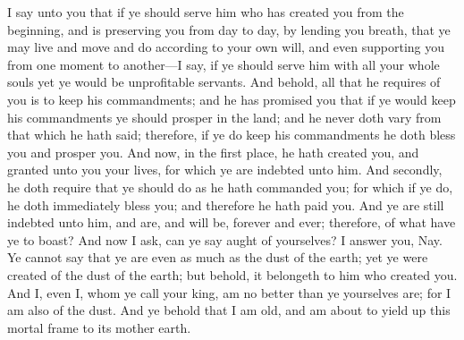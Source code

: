 I say unto you that if ye should serve him who has created you from the beginning, and is preserving you from day to day, by lending you breath, that ye may live and move and do according to your own will, and even supporting you from one moment to another---I say, if ye should serve him with all your whole souls yet ye would be unprofitable servants.
\bverse \iffalse And behold, all that he requires of you is to keep his commandments; and he has promised you that if ye would keep his commandments ye should prosper in the land; and he never doth vary from that which he hath said; therefore, if ye do keep his commandments he doth bless you and prosper you. \fi
And behold, all that he requires of you is to keep his commandments; and he has promised you that if ye would keep his commandments ye should prosper in the land; and he never doth vary from that which he hath said; therefore, if ye do keep his commandments he doth bless you and prosper you.
\bverse \iffalse And now, in the first place, he hath created you, and granted unto you your lives, for which ye are indebted unto him. \fi
And now, in the first place, he hath created you, and granted unto you your lives, for which ye are indebted unto him.
\bverse \iffalse And secondly, he doth require that ye should do as he hath commanded you; for which if ye do, he doth immediately bless you; and therefore he hath paid you. And ye are still indebted unto him, and are, and will be, forever and ever; therefore, of what have ye to boast? \fi
And secondly, he doth require that ye should do as he hath commanded you; for which if ye do, he doth immediately bless you; and therefore he hath paid you. And ye are still indebted unto him, and are, and will be, forever and ever; therefore, of what have ye to boast?
\bverse \iffalse And now I ask, can ye say aught of yourselves? I answer you, Nay. Ye cannot say that ye are even as much as the dust of the earth; yet ye were created of the dust of the earth; but behold, it belongeth to him who created you. \fi
And now I ask, can ye say aught of yourselves? I answer you, Nay. Ye cannot say that ye are even as much as the dust of the earth; yet ye were created of the dust of the earth; but behold, it belongeth to him who created you.
\bverse \iffalse And I, even I, whom ye call your king, am no better than ye yourselves are; for I am also of the dust. And ye behold that I am old, and am about to yield up this mortal frame to its mother earth. \fi
And I, even I, whom ye call your king, am no better than ye yourselves are; for I am also of the dust. And ye behold that I am old, and am about to yield up this mortal frame to its mother earth.
